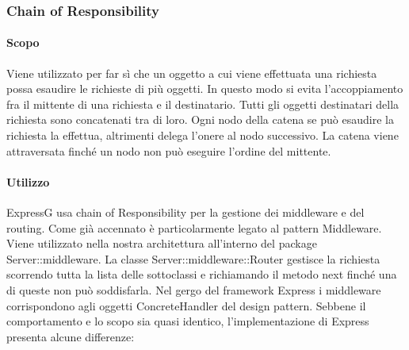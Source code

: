 \documentclass[12pt,a4paper]{article}
\begin{document}
\subsubsection{Chain of Responsibility}
\paragraph{Scopo}
Viene utilizzato per far sì che un oggetto a cui viene effettuata una richiesta possa esaudire le richieste di più oggetti. In questo modo si evita l’accoppiamento fra il mittente di una richiesta e il destinatario. Tutti gli oggetti destinatari della richiesta sono concatenati tra di loro. Ogni nodo della catena se può esaudire la richiesta la effettua, altrimenti delega l’onere al nodo successivo. La catena viene attraversata finché un nodo non può eseguire l’ordine del mittente.
\paragraph{Utilizzo}
ExpressG usa chain of Responsibility per la gestione dei middleware e del routing. Come già accennato è particolarmente legato al pattern Middleware. Viene utilizzato nella nostra architettura all’interno del package Server::middleware.
La classe Server::middleware::Router gestisce la richiesta
scorrendo tutta la lista delle sottoclassi e richiamando il metodo next finché una di queste non può soddisfarla.
Nel gergo del framework Express i middleware corrispondono agli oggetti ConcreteHandler del design pattern. Sebbene il comportamento e lo scopo sia quasi identico, l’implementazione di
Express presenta alcune differenze:
\end{document}
